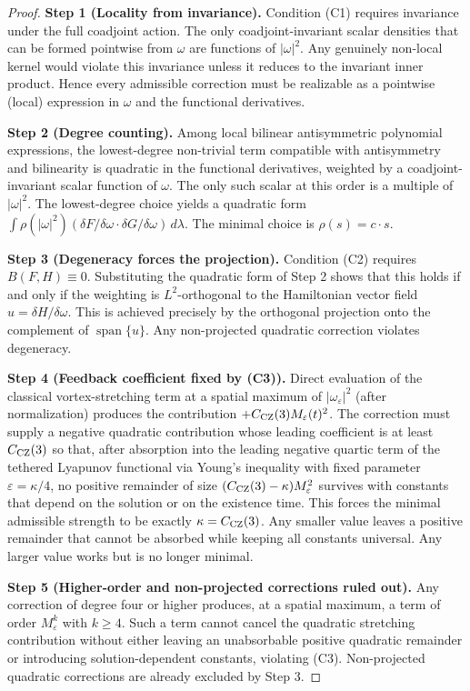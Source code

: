 \documentclass[11pt,a4paper]{article}
\begin{document}
\begin{proof}
\textbf{Step 1 (Locality from invariance).} Condition (C1) requires invariance under the full coadjoint action. The only coadjoint-invariant scalar densities that can be formed pointwise from $\omega$ are functions of $|\omega|^2$. Any genuinely non-local kernel would violate this invariance unless it reduces to the invariant inner product. Hence every admissible correction must be realizable as a pointwise (local) expression in $\omega$ and the functional derivatives.

\textbf{Step 2 (Degree counting).} Among local bilinear antisymmetric polynomial expressions, the lowest-degree non-trivial term compatible with antisymmetry and bilinearity is quadratic in the functional derivatives, weighted by a coadjoint-invariant scalar function of $\omega$. The only such scalar at this order is a multiple of $|\omega|^2$. The lowest-degree choice yields a quadratic form $\int \rho(|\omega|^2) (\delta F/\delta\omega \cdot \delta G/\delta\omega) \, d\lambda$. The minimal choice is $\rho(s) = c \cdot s$.

\textbf{Step 3 (Degeneracy forces the projection).} Condition (C2) requires $B(F, H) \equiv 0$. Substituting the quadratic form of Step 2 shows that this holds if and only if the weighting is $L^2$-orthogonal to the Hamiltonian vector field $u = \delta H/\delta\omega$. This is achieved precisely by the orthogonal projection onto the complement of $\operatorname{span}\{u\}$. Any non-projected quadratic correction violates degeneracy.

\textbf{Step 4 (Feedback coefficient fixed by (C3)).} Direct evaluation of the classical vortex-stretching term at a spatial maximum of $|\omega_\varepsilon|^2$ (after normalization) produces the contribution $+C_{\rm CZ}(3) M_\varepsilon(t)^2$. The correction must supply a negative quadratic contribution whose leading coefficient is at least $C_{\rm CZ}(3)$ so that, after absorption into the leading negative quartic term of the tethered Lyapunov functional via Young’s inequality with fixed parameter $\varepsilon = \kappa/4$, no positive remainder of size $(C_{\rm CZ}(3) - \kappa)M_\varepsilon^2$ survives with constants that depend on the solution or on the existence time. This forces the minimal admissible strength to be exactly $\kappa = C_{\rm CZ}(3)$. Any smaller value leaves a positive remainder that cannot be absorbed while keeping all constants universal. Any larger value works but is no longer minimal.

\textbf{Step 5 (Higher-order and non-projected corrections ruled out).} Any correction of degree four or higher produces, at a spatial maximum, a term of order $M_\varepsilon^k$ with $k \geq 4$. Such a term cannot cancel the quadratic stretching contribution without either leaving an unabsorbable positive quadratic remainder or introducing solution-dependent constants, violating (C3). Non-projected quadratic corrections are already excluded by Step 3.


\end{proof}
\end{document}
